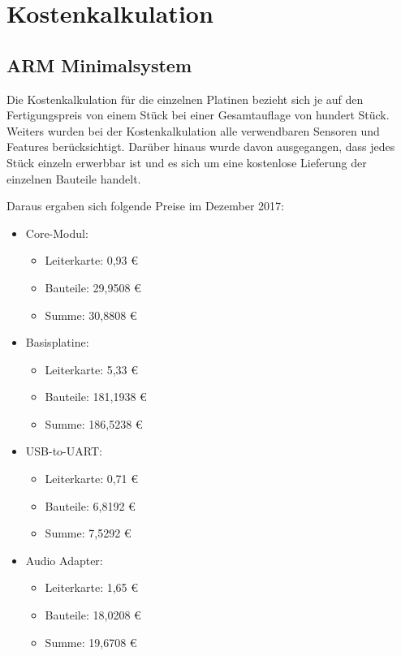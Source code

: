 \section{Kostenkalkulation}
\label{sec:kostenrechnung}
\subsection{ARM Minimalsystem}
\label{sec:arm-kostenrechnung}
Die Kostenkalkulation für die einzelnen Platinen bezieht sich je auf den Fertigungspreis von einem Stück bei einer Gesamtauflage von hundert Stück. Weiters wurden bei der Kostenkalkulation alle verwendbaren Sensoren und Features berücksichtigt. Darüber hinaus wurde davon ausgegangen, dass jedes Stück einzeln erwerbbar ist und es sich um eine kostenlose Lieferung der einzelnen Bauteile handelt.

Daraus ergaben sich folgende Preise im Dezember 2017:
\begin{itemize}
    \item \gls{Core-Modul}:
    \begin{itemize}
        \item Leiterkarte: 0,93 €
        \item Bauteile: 29,9508 €
        \item Summe: 30,8808 €
    \end{itemize}
    \item \gls{Basisplatine}:
    \begin{itemize}
        \item Leiterkarte: 5,33 €
        \item Bauteile: 181,1938 €
        \item Summe: 186,5238 €
    \end{itemize}
    \item \gls{USB-to-UART}:
    \begin{itemize}
        \item Leiterkarte: 0,71 €
        \item Bauteile: 6,8192 €
        \item Summe: 7,5292 €
    \end{itemize}
    \item Audio Adapter:
    \begin{itemize}
        \item Leiterkarte: 1,65 €
        \item Bauteile: 18,0208 €
        \item Summe: 19,6708 €
    \end{itemize}
\end{itemize}

